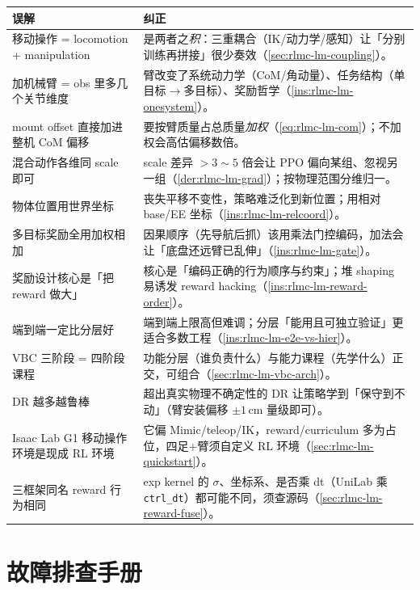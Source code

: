 \begin{center}
\small
\begin{tabular}{@{}p{5.2cm}p{8.5cm}@{}}
\toprule
误解 & 纠正 \\
\midrule
移动操作 = locomotion + manipulation & 是两者之\emph{积}：三重耦合（IK/动力学/感知）让「分别训练再拼接」很少奏效（\cref{sec:rlmc-lm-coupling}）。 \\
加机械臂 = obs 里多几个关节维度 & 臂改变了系统动力学（CoM/角动量）、任务结构（单目标$\to$多目标）、奖励哲学（\cref{ins:rlmc-lm-onesystem}）。 \\
mount offset 直接加进整机 CoM 偏移 & 要按臂质量占总质量\emph{加权}（\cref{eq:rlmc-lm-com}）；不加权会高估偏移数倍。 \\
混合动作各维同 scale 即可 & scale 差异 $>3\!\sim\!5$ 倍会让 PPO 偏向某组、忽视另一组（\cref{der:rlmc-lm-grad}）；按物理范围分维归一。 \\
物体位置用世界坐标 & 丧失平移不变性，策略难泛化到新位置；用相对 base/EE 坐标（\cref{ins:rlmc-lm-relcoord}）。 \\
多目标奖励全用加权相加 & 因果顺序（先导航后抓）该用乘法门控编码，加法会让「底盘还远臂已乱伸」（\cref{ins:rlmc-lm-gate}）。 \\
奖励设计核心是「把 reward 做大」 & 核心是「编码正确的行为顺序与约束」；堆 shaping 易诱发 reward hacking（\cref{ins:rlmc-lm-reward-order}）。 \\
端到端一定比分层好 & 端到端上限高但难调；分层「能用且可独立验证」更适合多数工程（\cref{ins:rlmc-lm-e2e-vs-hier}）。 \\
VBC 三阶段 = 四阶段课程 & 功能分层（谁负责什么）与能力课程（先学什么）正交，可组合（\cref{sec:rlmc-lm-vbc-arch}）。 \\
DR 越多越鲁棒 & 超出真实物理不确定性的 DR 让策略学到「保守到不动」（臂安装偏移 $\pm1\,$cm 量级即可）。 \\
Isaac Lab G1 移动操作环境是现成 RL 环境 & 它偏 Mimic/teleop/IK，reward/curriculum 多为占位，四足+臂须自定义 RL 环境（\cref{sec:rlmc-lm-quickstart}）。 \\
三框架同名 reward 行为相同 & exp kernel 的 $\sigma$、坐标系、是否乘 dt（UniLab 乘 \texttt{ctrl\_dt}）都可能不同，须查源码（\cref{sec:rlmc-lm-reward-fuse}）。 \\
\bottomrule
\end{tabular}
\end{center}

\section{故障排查手册}
\label{sec:rlmc-lm-trouble}

